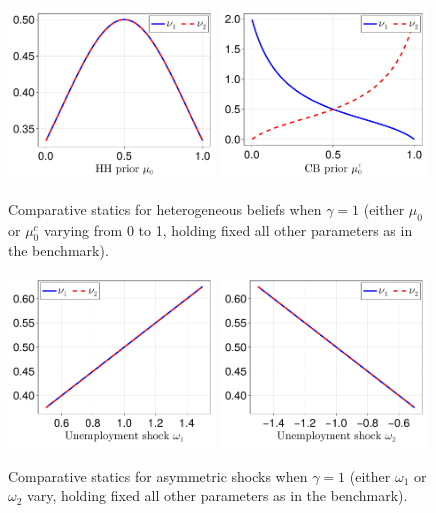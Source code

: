 \documentclass[12pt,a4paper]{article}
\begin{document}
\begin{figure}[H]
\centering
\includegraphics[width=0.49\textwidth]{figures/V9/γ_1/fig_optimal_ν_μ_0.pdf}
\includegraphics[width=0.49\textwidth]{figures/V9/γ_1/fig_optimal_ν_μ_0_c.pdf}
\caption{Comparative statics for heterogeneous beliefs when $\gamma=1$ (either $\mu_0$ or $\mu_0^c$ varying from 0 to 1, holding fixed all other parameters as in the benchmark).}
\label{FigureA33}
\end{figure}

\begin{figure}[H]
\centering
\includegraphics[width=0.49\textwidth]{figures/V9/γ_1/fig_optimal_ν_ω_1.pdf}
\includegraphics[width=0.49\textwidth]{figures/V9/γ_1/fig_optimal_ν_ω_2.pdf}
\caption{Comparative statics for asymmetric shocks when $\gamma=1$ (either $\omega_1$ or $\omega_2$ vary, holding fixed all other parameters as in the benchmark).}
\label{FigureA34}
\end{figure}
\end{document}
